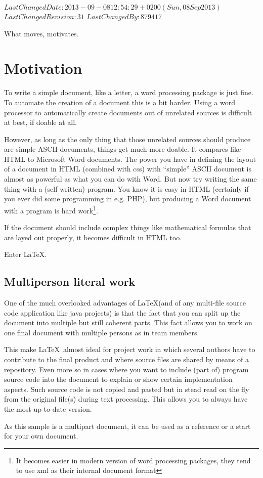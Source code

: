 %
{$LastChangedDate: 2013-09-08 12:54:29 +0200 (Sun, 08 Sep 2013) $}%
{$LastChangedRevision: 31 $}%
{$LastChangedBy: 879417 $}

\renewcommand\TheFile{motivates.tex}
\begin{savequote}[8cm]
  \sffamily
  What moves, motivates.
\end{savequote}
\chapter{Motivation}
To write a simple document, like a letter, a word processing package 
is just fine.
To automate the creation of a document this is a bit harder. 
Using a word processor to automatically create documents out of 
unrelated sources is difficult at best, if doable at all.

However, as long as the only thing that those unrelated sources should
produce are simple ASCII documents, things get much more
doable. It compares like HTML to Microsoft Word documents. The power
you have in defining the layout of a document in HTML (combined with
css) with ``simple'' ASCII document is almost as powerful as what you
can do with Word. But now try writing the same thing with a (self
written) program. You know it is easy in HTML (certainly if you ever
did some programming in e.g. PHP), but producing a Word document with
a program is hard work\footnote{It becomes easier in modern version of
word processing packages, they tend to use xml as their internal document format}. 

If the document should include complex things like mathematical
formulas that are layed out properly, it becomes difficult in HTML too.

Enter \LaTeX.

\section{Multiperson literal work}
One of the much overlooked advantages of \LaTeX (and of any multi-file
source code application like java projects) is that the fact that you
can split up the document into multiple but still coherent parts.
This fact allows you to work on one final document with multiple
persons as in team members.

This make \LaTeX\ almost ideal for project work in which several
authors have to contribute to the final product and where source files
are shared by means of a repository. Even more so in
cases where you want to include (part of) program source code
into the document to explain or show certain implementation
aspects. Such source code is not copied and pasted but in stead read
on the fly from the original file(s) during text processing. This
allows you to always have the most up to date version.

As this sample is a multipart document, it can be used as a reference
or a start for your own document.

